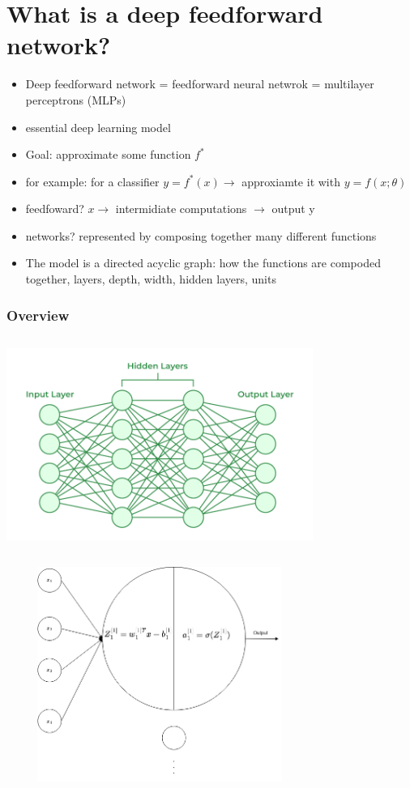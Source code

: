 \documentclass{beamer}
\begin{document}
\section{What is a deep feedforward network?}
\begin{frame}
\begin{itemize}
	\item Deep feedforward network = feedforward neural netwrok = multilayer perceptrons (MLPs)
	\item essential deep learning model
		\pause
	\item Goal: approximate some function $f^{\ast}$
	\item for example: for a classifier $y = f^{*}(x) \rightarrow$ approxiamte it with $y = f(x;\theta)$
		\pause
	\item feedfoward? $x \rightarrow$ intermidiate computations $\rightarrow $ output y
		\pause
	\item networks? represented by composing together many different functions
	\item The model is a directed acyclic graph: how the functions are compoded together, layers, depth, width, hidden layers, units
\end{itemize}
\end{frame}
\begin{frame}
	\frametitle{Overview}
	\center
	\includegraphics[width= 100mm, height = 70mm]{Neural-Networks-Architecture.png}
\end{frame}
\begin{frame}
	\center
	\includegraphics[width = 100mm, height= 70mm]{single_neuron.png}
\end{frame}
\end{document}
